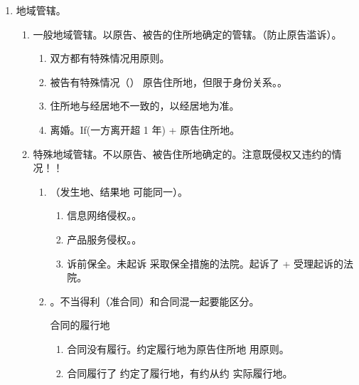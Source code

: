 \begin{enumerate}
        \begin{kk}{高院}
          本辖区范围重大影响的。
        \end{kk}

        \begin{kk}{最高法}
          \begin{enumerate}
            \item 全国范围重大影响。
            \item 认为应当由本院审理的案件。宣告性意义（有且仅有最高法有权）。
          \end{enumerate}
        \end{kk}
  \item 地域管辖。
        \begin{enumerate}
          \item 一般地域管辖。以原告、被告的住所地确定的管辖。（防止原告滥诉）。
                \begin{enumerate}
                  \item 双方都有特殊情况用原则。
                  \item 被告有特殊情况（） \yjt 原告住所地，但限于身份关系。。
                  \item 住所地与经居地不一致的，以经居地为准。
                  \item 离婚。If(一方离开超 1 年) + 原告住所地。
                \end{enumerate}
          \item 特殊地域管辖。不以原告、被告住所地确定的。注意既侵权又违约的情况！！
                \begin{enumerate}
                  \item {}（发生地、结果地 \yjt 可能同一）。
                        \begin{enumerate}
                          \item 信息网络侵权。。
                          \item 产品服务侵权。。
                          \item 诉前保全。未起诉 \yjt 采取保全措施的法院。起诉了 \yjt + 受理起诉的法院。
                        \end{enumerate}
                  \item {}。不当得利（准合同）和合同混一起要能区分。
                        \begin{kk}{合同的履行地}
                          \begin{enumerate}
                            \item 合同没有履行。约定履行地为原告住所地 \yjt 用原则。
                            \item 合同履行了 \yjt 约定了履行地，有约从约 \yjt 实际履行地。
                          \end{enumerate}
                        \end{kk}


\end{enumerate}
\end{enumerate}
\end{enumerate}
